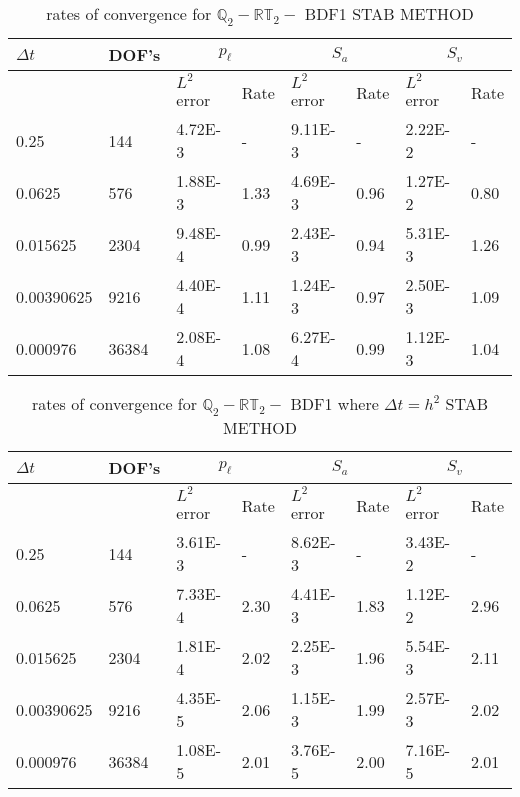 \begin{table}[ht]
	\centering
	\begin{tabular}{|l|l|l|l|l|l|l|l|}
		\hline
		$\Delta t$ & DOF's & \multicolumn{2}{c|}{$p_{\ell}$} & \multicolumn{2}{c|}{$S_a$} & \multicolumn{2}{c|}{$S_v$}  \\ \hline
		& & $L^2$ error & Rate & $L^2$ error & Rate & $L^2$ error & Rate \\ \hline
		0.25   	  & 144   & 4.72E-3 & -	   & 9.11E-3 & -    & 2.22E-2 & - \\ \hline
		0.0625    & 576   & 1.88E-3 & 1.33 & 4.69E-3 & 0.96 & 1.27E-2 & 0.80 \\ \hline
		0.015625  & 2304  & 9.48E-4 & 0.99 & 2.43E-3 & 0.94 & 5.31E-3 & 1.26 \\ \hline
		0.00390625& 9216  & 4.40E-4 & 1.11 & 1.24E-3 & 0.97 & 2.50E-3 & 1.09 \\ \hline 
		0.000976  & 36384 & 2.08E-4 & 1.08 & 6.27E-4 & 0.99 & 1.12E-3 & 1.04  \\ \hline
	\end{tabular}
	\caption[Template table-description for list of tables.]{ rates of convergence for $\mathbb{Q}_2 - \mathbb{RT}_2-$ BDF1  STAB METHOD }
\end{table}

\begin{table}[ht]
	\centering
	\begin{tabular}{|l|l|l|l|l|l|l|l|}
		\hline
		$\Delta t$ & DOF's & \multicolumn{2}{c|}{$p_{\ell}$} & \multicolumn{2}{c|}{$S_a$} & \multicolumn{2}{c|}{$S_v$}  \\ \hline
		& & $L^2$ error & Rate & $L^2$ error & Rate & $L^2$ error & Rate \\ \hline
		0.25   	  & 144   & 3.61E-3 & -	   & 8.62E-3 & -    & 3.43E-2 & - \\ \hline
		0.0625    & 576   & 7.33E-4 & 2.30 & 4.41E-3 & 1.83 & 1.12E-2 & 2.96 \\ \hline
		0.015625  & 2304  & 1.81E-4 & 2.02 & 2.25E-3 & 1.96 & 5.54E-3 & 2.11 \\ \hline
		0.00390625& 9216  & 4.35E-5 & 2.06 & 1.15E-3 & 1.99 & 2.57E-3 & 2.02 \\ \hline 
		0.000976  & 36384 & 1.08E-5 & 2.01 & 3.76E-5 & 2.00 & 7.16E-5 & 2.01  \\ \hline
	\end{tabular}
	\caption[Template table-description for list of tables.]{ rates of convergence for $\mathbb{Q}_2 - \mathbb{RT}_2-$ BDF1 where $\Delta t = h^2$  STAB METHOD }
\end{table}

